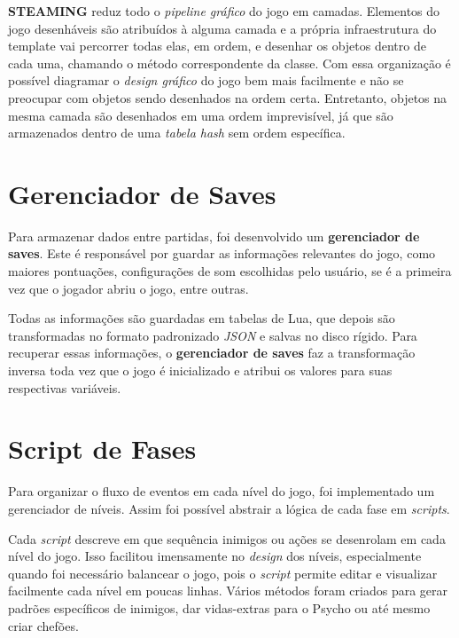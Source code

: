 \textbf{STEAMING} reduz todo o \textit{pipeline gráfico} do jogo em camadas. Elementos do jogo desenháveis são atribuídos à alguma camada e a própria infraestrutura do template vai percorrer todas elas, em ordem, e desenhar os objetos dentro de cada uma, chamando o método correspondente da classe. Com essa organização é possível diagramar o \textit{design gráfico} do jogo bem mais facilmente e não se preocupar com objetos sendo desenhados na ordem certa. Entretanto, objetos na mesma camada são desenhados em uma ordem imprevisível, já que são armazenados dentro de uma \textit{tabela hash} sem ordem específica.

\section{Gerenciador de Saves}
\label{sec:gerenciador_de_saves}

Para armazenar dados entre partidas, foi desenvolvido um \textbf{gerenciador de saves}. Este é responsável por guardar as informações relevantes do jogo, como maiores pontuações, configurações de som escolhidas pelo usuário, se é a primeira vez que o jogador abriu o jogo, entre outras.

Todas as informações são guardadas em tabelas de Lua, que depois são transformadas no formato padronizado \textit{JSON} e salvas no disco rígido. Para recuperar essas informações, o \textbf{gerenciador de saves} faz a transformação inversa toda vez que o jogo é inicializado e atribui os valores para suas respectivas variáveis.

\section{Script de Fases}
\label{sec:level_script}

Para organizar o fluxo de eventos em cada nível do jogo, foi implementado um gerenciador de níveis. Assim foi possível abstrair a lógica de cada fase em \textit{scripts}.

Cada \textit{script} descreve em que sequência inimigos ou ações se desenrolam em cada nível do jogo. Isso facilitou imensamente no \textit{design} dos níveis, especialmente quando foi necessário balancear o jogo, pois o \textit{script} permite editar e visualizar facilmente cada nível em poucas linhas. Vários métodos foram criados para gerar padrões específicos de inimigos, dar vidas-extras para o Psycho ou até mesmo criar chefões.

